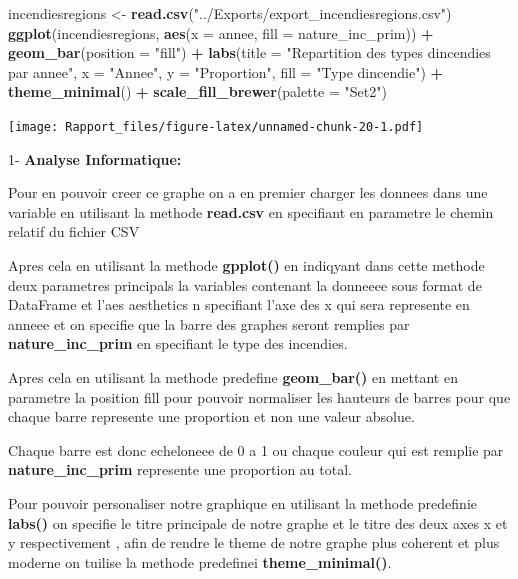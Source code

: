 \documentclass[
]{article}
\newenvironment{Shaded}{\begin{snugshade}}{\end{snugshade}}
\newcommand{\AttributeTok}[1]{\textcolor[rgb]{0.13,0.29,0.53}{#1}}
\newcommand{\FunctionTok}[1]{\textcolor[rgb]{0.13,0.29,0.53}{\textbf{#1}}}
\newcommand{\NormalTok}[1]{#1}
\newcommand{\OtherTok}[1]{\textcolor[rgb]{0.56,0.35,0.01}{#1}}
\newcommand{\SpecialCharTok}[1]{\textcolor[rgb]{0.81,0.36,0.00}{\textbf{#1}}}
\newcommand{\StringTok}[1]{\textcolor[rgb]{0.31,0.60,0.02}{#1}}
\begin{document}
\begin{Shaded}
\begin{Highlighting}[]
\NormalTok{incendiesregions }\OtherTok{\textless{}{-}} \FunctionTok{read.csv}\NormalTok{(}\StringTok{"../Exports/export\_incendiesregions.csv"}\NormalTok{)}
\FunctionTok{ggplot}\NormalTok{(incendiesregions, }\FunctionTok{aes}\NormalTok{(}\AttributeTok{x =}\NormalTok{ annee, }\AttributeTok{fill =}\NormalTok{ nature\_inc\_prim)) }\SpecialCharTok{+}
  \FunctionTok{geom\_bar}\NormalTok{(}\AttributeTok{position =} \StringTok{"fill"}\NormalTok{) }\SpecialCharTok{+}  
  \FunctionTok{labs}\NormalTok{(}\AttributeTok{title =} \StringTok{"Repartition des types d\textquotesingle{}incendies par annee"}\NormalTok{,}
       \AttributeTok{x =} \StringTok{"Annee"}\NormalTok{,}
       \AttributeTok{y =} \StringTok{"Proportion"}\NormalTok{,}
       \AttributeTok{fill =} \StringTok{"Type d\textquotesingle{}incendie"}\NormalTok{) }\SpecialCharTok{+}
  \FunctionTok{theme\_minimal}\NormalTok{() }\SpecialCharTok{+}  
  \FunctionTok{scale\_fill\_brewer}\NormalTok{(}\AttributeTok{palette =} \StringTok{"Set2"}\NormalTok{)}
\end{Highlighting}
\end{Shaded}

\texttt{[image: Rapport\_files/figure-latex/unnamed-chunk-20-1.pdf]}

1- \textbf{Analyse Informatique:}

Pour en pouvoir creer ce graphe on a en premier charger les donnees dans
une variable en utilisant la methode \textbf{read.csv} en specifiant en
parametre le chemin relatif du fichier CSV

Apres cela en utilisant la methode \textbf{gpplot()} en indiqyant dans
cette methode deux parametres principals la variables contenant la
donneeee sous format de DataFrame et l'aes aesthetics n specifiant l'axe
des x qui sera represente en anneee et on specifie que la barre des
graphes seront remplies par \textbf{nature\_inc\_prim} en specifiant le
type des incendies.

Apres cela en utilisant la methode predefine \textbf{geom\_bar()} en
mettant en parametre la position fill pour pouvoir normaliser les
hauteurs de barres pour que chaque barre represente une proportion et
non une valeur absolue.

Chaque barre est donc echeloneee de 0 a 1 ou chaque couleur qui est
remplie par \textbf{nature\_inc\_prim} represente une proportion au
total.

Pour pouvoir personaliser notre graphique en utilisant la methode
predefinie \textbf{labs()} on specifie le titre principale de notre
graphe et le titre des deux axes x et y respectivement , afin de rendre
le theme de notre graphe plus coherent et plus moderne on tuilise la
methode predefinei \textbf{theme\_minimal()}.
\end{document}
